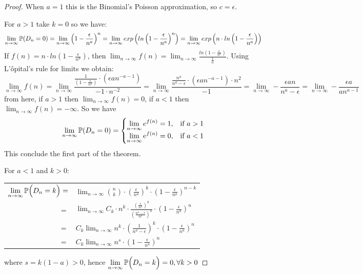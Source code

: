 \begin{proof}
When $a=1$ this is the Binomial's Poisson approximation, so $c=\epsilon$.

For $a>1$ take $k=0$ so we have:
$$\displaystyle\lim_{n\to \infty} \P(D_n = 0) = \displaystyle\lim_{n\to \infty } \left( 1 - \frac{\epsilon}{n^a}\right)^n = \displaystyle\lim_{n\to \infty} exp\left( ln \left( 1 - \frac{\epsilon}{n^a}\right)^n\right) = \displaystyle\lim_{n\to \infty} exp\left(n \cdot ln \left( 1 - \frac{\epsilon}{n^a}\right)\right)$$
If $f(n)=  n \cdot ln \left( 1 - \frac{\epsilon}{n^a}\right)$, then $\displaystyle\lim_{n\to \infty} f(n) = \displaystyle\lim_{n\to \infty}\frac{ln \left( 1 - \frac{\epsilon}{n^a}\right)}{\frac{1}{n}}$. Using L'ôpital's rule for limits we obtain:
$$\displaystyle\lim_{n\to \infty } f(n) = 
\displaystyle\lim_{n\to \infty } \frac{\frac{1}{\left( 1 - \frac{\epsilon}{n^a}\right)}\cdot (\epsilon a n^{-a-1})}
{-1\cdot n^{-2}} = 
\displaystyle\lim_{n\to \infty } \frac{\frac{n^a}{n^{a} - \epsilon}\cdot (\epsilon a n^{-a-1}) \cdot {n^{2}}}{-1} = 
\displaystyle\lim_{n\to \infty } - \frac{\epsilon a n}{n^{a} - \epsilon} =
\displaystyle\lim_{n\to \infty } - \frac{\epsilon a}{a n^{a-1}}
$$
from here, if $a>1$ then $\displaystyle\lim_{n\to \infty } f(n) = 0$, if $a<1$ then $\displaystyle\lim_{n\to \infty } f(n) = -\infty$. So we have
$$ \displaystyle\lim_{n\to \infty} \P(D_n=0) = \begin{cases} 
\displaystyle\lim_{n\to \infty}e^{f(n)} = 1, & \mbox{if } a>1 \\ 
\displaystyle\lim_{n\to \infty}e^{f(n)} = 0, & \mbox{if } a<1 \end{cases} $$
This conclude the first part of the theorem. 

For $a<1$ and $k>0$:
\begin{center}
\begin{tabular}{ r l }
 $\displaystyle\lim_{n\to \infty } \P\Big(D_n=k\Big) =$ & $\displaystyle\lim_{n\to \infty} \binom{n}{k} \cdot \left( \frac{\epsilon}{n^a} \right)^k \cdot \left( 1-\frac{\epsilon}{n^a}\right)^{n-k}$ \\
$=$ &  $\displaystyle\lim_{n\to \infty} C_{k}\cdot n^k\cdot  \frac{\left(\frac{\epsilon}{n^a}\right)^k} {\left(\frac{n^a - \epsilon}{n^a}\right)^k} \cdot \left(1-\frac{\epsilon}{n^a}\right)^{n} $\\
$=$ &  $C_{k}\displaystyle\lim_{n\to \infty} n^k \cdot \left(\frac{1} {n^a - \epsilon}\right)^k \cdot \left(1-\frac{\epsilon}{n^a}\right)^{n} $\\
$=$ &  $C_{k} \displaystyle\lim_{n\to \infty}  n^s\cdot \left(1-\frac{\epsilon}{n^a}\right)^{n}$\\
\end{tabular}
\end{center}

where $s=k(1-a)>0$, hence $\displaystyle\lim_{n\to \infty } \P\Big(D_n=k\Big) = 0, \forall k>0$ 

\end{proof}


